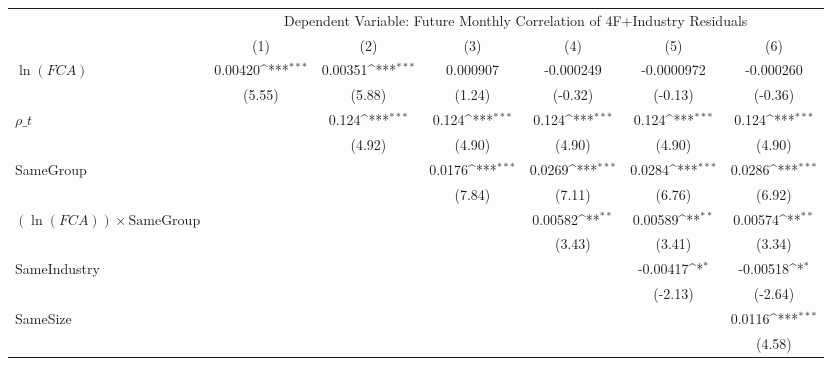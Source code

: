 {
\def\sym#1{\ifmmode^{#1}\else\(^{#1}\)\fi}
\begin{tabular}{l*{6}{c}}
\hline\hline
                &\multicolumn{6}{c}{Dependent Variable: Future Monthly Correlation of 4F+Industry Residuals}                      \\\cmidrule(lr){2-7}
                &\multicolumn{1}{c}{(1)}         &\multicolumn{1}{c}{(2)}         &\multicolumn{1}{c}{(3)}         &\multicolumn{1}{c}{(4)}         &\multicolumn{1}{c}{(5)}         &\multicolumn{1}{c}{(6)}         \\
\hline
$\ln(FCA)$      &  0.00420\sym{***}&  0.00351\sym{***}& 0.000907         &-0.000249         &-0.0000972         &-0.000260         \\
                &   (5.55)         &   (5.88)         &   (1.24)         &  (-0.32)         &  (-0.13)         &  (-0.36)         \\
[1em]
 $ {\rho\_t} $   &                  &    0.124\sym{***}&    0.124\sym{***}&    0.124\sym{***}&    0.124\sym{***}&    0.124\sym{***}\\
                &                  &   (4.92)         &   (4.90)         &   (4.90)         &   (4.90)         &   (4.90)         \\
[1em]
SameGroup       &                  &                  &   0.0176\sym{***}&   0.0269\sym{***}&   0.0284\sym{***}&   0.0286\sym{***}\\
                &                  &                  &   (7.84)         &   (7.11)         &   (6.76)         &   (6.92)         \\
[1em]
$ (\ln(FCA)) \times {\text{SameGroup} }  $ &                  &                  &                  &  0.00582\sym{**} &  0.00589\sym{**} &  0.00574\sym{**} \\
                &                  &                  &                  &   (3.43)         &   (3.41)         &   (3.34)         \\
[1em]
SameIndustry    &                  &                  &                  &                  & -0.00417\sym{*}  & -0.00518\sym{*}  \\
                &                  &                  &                  &                  &  (-2.13)         &  (-2.64)         \\
[1em]
SameSize        &                  &                  &                  &                  &                  &   0.0116\sym{***}\\
                &                  &                  &                  &                  &                  &   (4.58)         \\

\end{tabular}}
